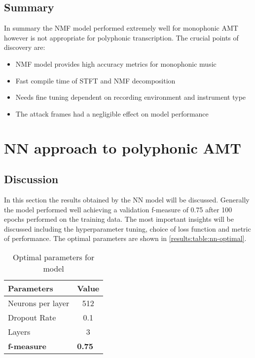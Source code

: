 \subsection{Summary}

In summary the \ac{NMF} model performed extremely well for monophonic AMT however is not
appropriate for polyphonic transcription. The crucial points of discovery are:

\begin{itemize}
    \item \ac{NMF} model provides high accuracy metrics for monophonic music
    \item Fast compile time of \ac{STFT} and \ac{NMF} decomposition
    \item Needs fine tuning dependent on recording environment and instrument type
    \item The attack frames had a negligible effect on model performance
\end{itemize}


\section{NN approach to polyphonic AMT}

\subsection{Discussion}
In this section the results obtained by the \ac{NN} model will be discussed.
Generally the model performed well achieving a validation f-measure of 0.75 after
100 epochs performed on the training data. The most important insights will be
discussed including the hyperparameter tuning, choice of loss function and
metric of performance. The optimal parameters are shown in \autoref{results:table:nn-optimal}.


\begin{table}[!ht]
    \centering
    \begin{tabular}{|l|c|}
        \hline
        \textbf{Parameters} & \multicolumn{1}{l|}{\textbf{Value}} \\ \hline
        Neurons per layer   & 512                                 \\ \hline
        Dropout Rate        & 0.1                                 \\ \hline
        Layers              & 3                                   \\ \hline
        \textbf{f-measure}  & \multicolumn{1}{l|}{\textbf{0.75}}  \\ \hline
    \end{tabular}
    \caption{Optimal parameters for model}
    \label{results:table:nn-optimal}
\end{table}

